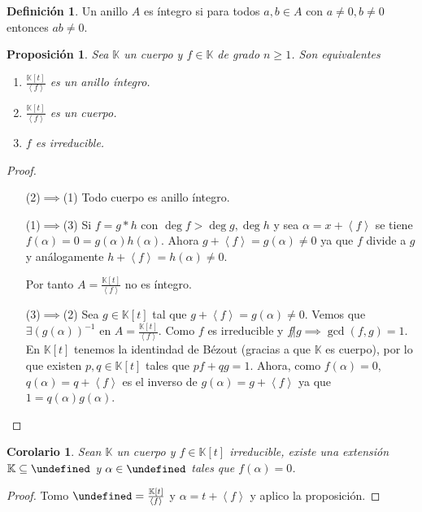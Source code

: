 \documentclass[10pt, spanish]{report}
\newtheorem*{prop}{Proposición}
\newtheorem*{cor}{Corolario}
\theoremstyle{definition}
\newtheorem*{defin}{Definición}
\newcommand{\K}{\mathbb{K}}
\let\L\undefined
\newcommand{\L}{\mathbb{L}}
\renewcommand{\geq}{\geqslant}
\newcommand{\fecha}[1]{\marginpar{\underline{#1}}}
\begin{document}
\fecha{17/02}
\begin{defin}
    Un anillo $A$ es íntegro si para todos $a,b\in A$ con $a\neq 0, b\neq 0$
    entonces $ab\neq 0$.
\end{defin}
\begin{prop}
    Sea $\K$ un cuerpo y $f\in \K$ de grado $n\geq1$. Son equivalentes
    \begin{enumerate}
        \item $\frac{\K[t]}{\left< f \right>}$ es un anillo íntegro.
        \item $\frac{\K[t]}{\left< f\right>}$ es un cuerpo.
        \item $f$ es irreducible.
    \end{enumerate}
\end{prop}
\begin{proof}\hspace{1em}
    \begin{itemize}
        \item[(2)$\implies$(1)] Todo cuerpo es anillo íntegro.
        \item[(1)$\implies$(3)] Si $f=g*h$ con $\deg{f}>\deg{g},\deg{h}$ y sea
            $\alpha = x+\left< f \right> $ se tiene
            $f(\alpha)=0=g(\alpha)h(\alpha)$.
            Ahora $g+\left< f \right> = g(\alpha) \neq 0$ ya que $f$ divide a
            $g$ y análogamente $h+\left< f \right> = h(\alpha)\neq 0$.

            Por tanto $A=\frac{\K[t]}{\left< f \right> }$ no es íntegro.
        \item[(3)$\implies$(2)] Sea $g\in \K[t]$  tal que $g+\left< f \right>
            =g(\alpha)\neq 0$. Vemos que $\exists(g(\alpha))^{-1}$ en
            $A=\frac{\K[t]}{\left< f \right> }$. Como $f$ es irreducible y
            $f\not|g \implies \gcd(f,g)=1$. En $\K[t]$ tenemos la identindad de
            Bézout (gracias a que $\K$ es cuerpo), por lo que existen $p,q\in
            \K[t]$ tales que $pf+qg=1$.
            Ahora, como $f(\alpha)=0$, $q(\alpha)=q+\left< f \right>$  es el
            inverso de $g(\alpha)=g+\left< f \right>$ ya que $1=q(\alpha)
            g(\alpha)$.
    \end{itemize}
\end{proof}
\begin{cor}
    Sean $\K$ un cuerpo y $f\in\K[t]$ irreducible, existe una extensión
    $\K\subseteq\L$ y $\alpha\in\L$ tales que $f(\alpha)=0$.
\end{cor}
\begin{proof}
    Tomo $\L=\frac{\K[t]}{\left< f \right> }$ y $\alpha=t+\left< f \right> $ y
    aplico la proposición.
\end{proof}
\end{document}
